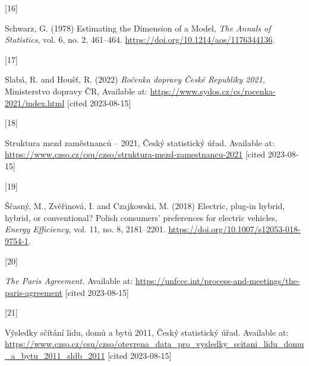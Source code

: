 \documentclass{mmeproc}
\newlength{\cslhangindent}
\newlength{\csllabelwidth}
\newenvironment{CSLReferences}[2] %
 {%
  \setlength{\parindent}{0pt}
  \ifodd #1
  \fi
  \setlength{\parskip}{-2pt}
 }%
 {}
\newcommand{\CSLLeftMargin}[1]{\parbox[t]{\csllabelwidth}{#1}}
\newcommand{\CSLRightInline}[1]{\parbox[t]{\linewidth - \csllabelwidth}{#1}\break}
\begin{document}
\begin{CSLReferences}{0}{0}
\leavevmode{}%
\CSLLeftMargin{{[}16{]} }%
\CSLRightInline{Schwarz, G. (1978) {Estimating the {Dimension} of a
{Model},} \emph{The Annals of Statistics}, vol. 6, no. 2, 461--464.
\url{https://doi.org/10.1214/aos/1176344136}.}

\leavevmode{}%
\CSLLeftMargin{{[}17{]} }%
\CSLRightInline{Slabá, R. and Houšť, R. (2022) \emph{Ročenka dopravy {České
Republiky} 2021,} {Ministerstvo dopravy ČR}, Available at:
\url{https://www.sydos.cz/cs/rocenka-2021/index.html} {{[}cited 2023-08-15{]}}}

\leavevmode{}%
\CSLLeftMargin{{[}18{]} }%
\CSLRightInline{{Struktura mezd zaměstnanců -- 2021,} Český
statistický úřad. Available at:
\url{https://www.czso.cz/csu/czso/struktura-mezd-zamestnancu-2021} {{[}cited 2023-08-15{]}}}

\leavevmode{}%
\CSLLeftMargin{{[}19{]} }%
\CSLRightInline{Ščasný, M., Zvěřinová, I. and Czajkowski, M. (2018) {Electric,
plug-in hybrid, hybrid, or conventional? {Polish} consumers' preferences
for electric vehicles,} \emph{Energy Efficiency}, vol. 11, no. 8, 2181--2201.
\url{https://doi.org/10.1007/s12053-018-9754-1}.}

\leavevmode{}%
\CSLLeftMargin{{[}20{]} }%
\CSLRightInline{\emph{The {Paris} {Agreement}.} Available at:
\url{https://unfccc.int/process-and-meetings/the-paris-agreement} {{[}cited 2023-08-15{]}}}

\leavevmode{}%
\CSLLeftMargin{{[}21{]} }%
\CSLRightInline{{Výsledky sčítání lidu, domů a bytů 2011}, Český statistický úřad. Available at:
\url{https://www.czso.cz/csu/czso/otevrena_data_pro_vysledky_scitani_lidu_domu_a_bytu_2011_sldb_2011} {{[}cited 2023-08-15{]}}}

\end{CSLReferences}
\end{document}
